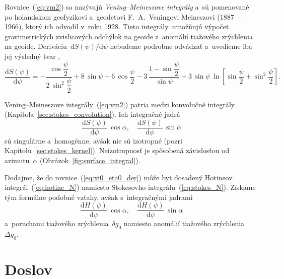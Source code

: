 \documentclass[a4paper, 12pt]{book}
\newcommand{\diff}{\mathrm d}
\begin{document}
Rovnice~(\ref{eq:vm2}) sa nazývajú \emph{Vening--Meineszove integrály} a~sú 
pomenované po holandskom geofyzikovi a~geodetovi F.~A.~Veningovi Meineszovi 
(1887~-- 1966), ktorý ich odvodil v~roku 1928.  Tieto integrály~umožňujú 
výpočet gravimetrických zvislicových odchýlok na geoide z~anomálií tiažového 
zrýchlenia na geoide.  Deriváciu~$\diff S(\psi) \slash \diff\psi$ nebudeme 
podrobne odvádzať a~uvedieme iba jej výsledný tvar
\parencite{MoritzPhysicalGeodesy},
%
\begin{equation}
\frac{\diff S(\psi)}{\diff \psi} = - \frac{\cos\dfrac{\psi}{2}}{2 \, 
\sin^2\dfrac{\psi}{2}} + 8 \, \sin\psi - 6 \, \cos\dfrac{\psi}{2} - 3\, \frac{1 
- \sin\dfrac{\psi}{2}}{\sin\psi} + 3 \, \sin\psi \, \ln \left[ 
\sin\dfrac{\psi}{2} + \sin^2\dfrac{\psi}{2} \right]{.}
\end{equation}

Vening--Meineszove integrály~(\ref{eq:vm2}) patria medzi konvolučné integrály 
(Kapitola~\ref{sec:stokes_convolution}).  Ich integračné jadrá
%
\begin{equation}
\label{eq:vm_kernels}
\frac{\diff S(\psi)}{\diff\psi} \, \cos\alpha{,} \quad \frac{\diff 
S(\psi)}{\diff\psi} \, \sin\alpha
\end{equation}
%
sú singulárne a~homogénne, avšak nie sú izotropné (pozri 
Kapitolu~\ref{sec:stokes_kernel}).  Neizotropnosť je spôsobená závislosťou od 
azimutu~$\alpha$ (Obrázok~\ref{fig:surface_integral}).

Dodajme, že do rovnice~(\ref{eq:xi0_eta0_der}) môže byť dosadený Hotineov 
integrál~(\ref{eq:hotine_N}) namiesto Stokesovho integrálu~(\ref{eq:stokes_N}).  
Získame tým formálne podobné vzťahy, avšak s~integračnými jadrami
%
\begin{equation}
\label{eq:vm_kernels2}
\frac{\diff H(\psi)}{\diff\psi} \, \cos\alpha{,} \quad \frac{\diff 
H(\psi)}{\diff\psi} \, \sin\alpha
\end{equation}
%
a~poruchami tiažového zrýchlenia~$\delta g_0$ namiesto anomálií tiažového 
zrýchlenia~$\Delta g_0$.






\chapter*{Doslov}
\end{document}
